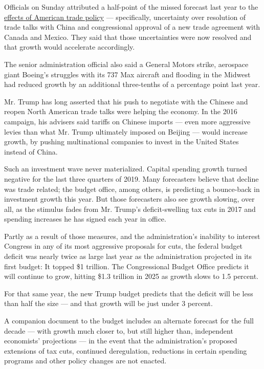 Officials on Sunday attributed a half-point of the missed forecast last
year to the
\href{https://www.nytimes3xbfgragh.onion/2020/01/06/business/economy/trade-war-tariffs.html}{effects
of American trade policy} --- specifically, uncertainty over resolution
of trade talks with China and congressional approval of a new trade
agreement with Canada and Mexico. They said that those uncertainties
were now resolved and that growth would accelerate accordingly.

The senior administration official also said a General Motors strike,
aerospace giant Boeing's struggles with its 737 Max aircraft and
flooding in the Midwest had reduced growth by an additional three-tenths
of a percentage point last year.

Mr. Trump has long asserted that his push to negotiate with the Chinese
and reopen North American trade talks were helping the economy. In the
2016 campaign, his advisers said tariffs on Chinese imports --- even
more aggressive levies than what Mr. Trump ultimately imposed on Beijing
--- would increase growth, by pushing multinational companies to invest
in the United States instead of China.

Such an investment wave never materialized. Capital spending growth
turned negative for the last three quarters of 2019. Many forecasters
believe that decline was trade related; the budget office, among others,
is predicting a bounce-back in investment growth this year. But those
forecasters also see growth slowing, over all, as the stimulus fades
from Mr. Trump's deficit-swelling tax cuts in 2017 and spending
increases he has signed each year in office.

Partly as a result of those measures, and the administration's inability
to interest Congress in any of its most aggressive proposals for cuts,
the federal budget deficit was nearly twice as large last year as the
administration projected in its first budget: It topped \$1 trillion.
The Congressional Budget Office predicts it will continue to grow,
hitting \$1.3 trillion in 2025 as growth slows to 1.5 percent.

For that same year, the new Trump budget predicts that the deficit will
be less than half the size --- and that growth will be just under 3
percent.

A companion document to the budget includes an alternate forecast for
the full decade --- with growth much closer to, but still higher than,
independent economists' projections --- in the event that the
administration's proposed extensions of tax cuts, continued
deregulation, reductions in certain spending programs and other policy
changes are not enacted.

